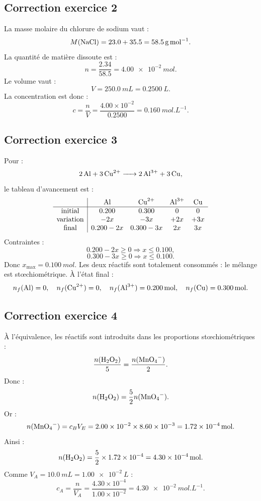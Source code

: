 \documentclass[11pt,a4paper]{article}
\newcommand{\xmax}{x_{\max}}
\begin{document}
\subsection*{Correction exercice 2}
\begin{correctionbox}
La masse molaire du chlorure de sodium vaut :
\[
M(\ce{NaCl})=23.0+35.5=\SI{58.5}{g.mol^{-1}}.
\]
La quantité de matière dissoute est :
\[
n=\frac{2.34}{58.5}=\SI{4.00e-2}{mol}.
\]
Le volume vaut :
\[
V=\SI{250.0}{mL}=\SI{0.2500}{L}.
\]
La concentration est donc :
\[
c=\frac{n}{V}=\frac{4.00\times10^{-2}}{0.2500}=\SI{0.160}{mol.L^{-1}}.
\]
\end{correctionbox}

\subsection*{Correction exercice 3}
\begin{correctionbox}
Pour :
\[
\ce{2Al + 3Cu^{2+} -> 2Al^{3+} + 3Cu},
\]
le tableau d'avancement est :
\[
\begin{array}{c|cccc}
 & \ce{Al} & \ce{Cu^{2+}} & \ce{Al^{3+}} & \ce{Cu} \\
\hline
\text{initial} & 0.200 & 0.300 & 0 & 0 \\
\text{variation} & -2x & -3x & +2x & +3x \\
\text{final} & 0.200-2x & 0.300-3x & 2x & 3x
\end{array}
\]
Contraintes :
\[
0.200-2x\geq0\Rightarrow x\leq0.100,
\]
\[
0.300-3x\geq0\Rightarrow x\leq0.100.
\]
Donc $\xmax=\SI{0.100}{mol}$. Les deux réactifs sont totalement consommés : le mélange est stœchiométrique. À l'état final :
\[
n_f(\ce{Al})=0,
\quad n_f(\ce{Cu^{2+}})=0,
\quad n_f(\ce{Al^{3+}})=\SI{0.200}{mol},
\quad n_f(\ce{Cu})=\SI{0.300}{mol}.
\]
\end{correctionbox}

\subsection*{Correction exercice 4}
\begin{correctionbox}
À l'équivalence, les réactifs sont introduits dans les proportions stœchiométriques :
\[
\frac{n(\ce{H2O2})}{5}=\frac{n(\ce{MnO4^-})}{2}.
\]
Donc :
\[
n(\ce{H2O2})=\frac{5}{2}n(\ce{MnO4^-}).
\]
Or :
\[
n(\ce{MnO4^-})=c_BV_E=2.00\times10^{-2}\times8.60\times10^{-3}=\SI{1.72e-4}{mol}.
\]
Ainsi :
\[
n(\ce{H2O2})=\frac{5}{2}\times1.72\times10^{-4}=\SI{4.30e-4}{mol}.
\]
Comme $V_A=\SI{10.0}{mL}=\SI{1.00e-2}{L}$ :
\[
c_A=\frac{n}{V_A}=\frac{4.30\times10^{-4}}{1.00\times10^{-2}}=\SI{4.30e-2}{mol.L^{-1}}.
\]
\end{correctionbox}
\end{document}
